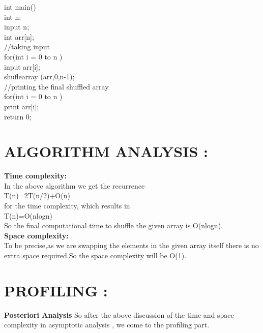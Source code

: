 \documentclass[conference]{IEEEtran}
\begin{document}
int main()\\
\indent\hspace{0.5cm}int n; \\
\indent\hspace{0.5cm}input  n;\\
\indent\hspace{0.5cm}int  arr[n];\\
\indent\hspace{0.5cm}//taking input\\
\indent\hspace{0.5cm}for(int i = 0 to n )\\
\indent\hspace{1.0cm}input  arr[i];\\
\indent\hspace{0.5cm}shuflearray (arr,0,n-1);\\
\indent\hspace{0.5cm}//printing the final shuffled array\\
\indent\hspace{0.5cm}for(int i = 0 to n )\\
\indent\hspace{1.0cm}print  arr[i];\\
\indent\hspace{0.5cm}return 0;\\



\section{\textbf{ALGORITHM ANALYSIS :}}
\textbf{Time complexity:}  \\
In the above algorithm we get the recurrence\\
T(n)=2T(n/2)+O(n)\\
for the time complexity, which results in \\
T(n)=O(nlogn)\\
So the final computational time to shuffle the given array is O(nlog⁡n).\\

\textbf{Space complexity:}\\
To be precise,as we are swapping the elements in the given array itself  there is no extra space required.So the space complexity will be O(1).


\section{\textbf{PROFILING :}}
\textbf{Posteriori Analysis}
So after the above discussion of the time and space complexity in asymptotic analysis , we come to the profiling part.
\end{document}
